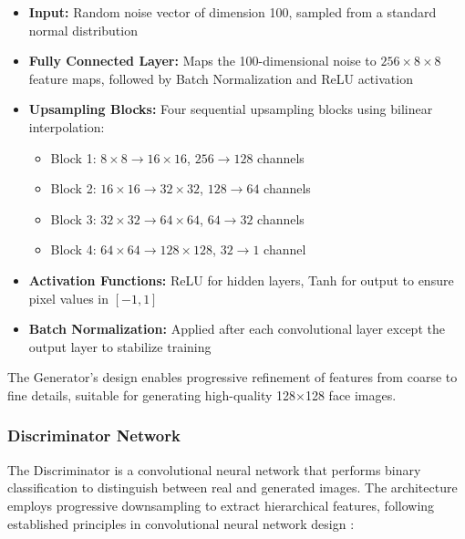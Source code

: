 \documentclass[a4paper, journal]{IEEEtran}
\begin{document}
\begin{itemize}
    \item \textbf{Input:} Random noise vector of dimension 100, sampled from a standard normal distribution
    \item \textbf{Fully Connected Layer:} Maps the 100-dimensional noise to $256 \times 8 \times 8$ feature maps, followed by Batch Normalization and ReLU activation
    \item \textbf{Upsampling Blocks:} Four sequential upsampling blocks using bilinear interpolation:
          \begin{itemize}
              \item Block 1: $8 \times 8 \rightarrow 16 \times 16$, $256 \rightarrow 128$ channels
              \item Block 2: $16 \times 16 \rightarrow 32 \times 32$, $128 \rightarrow 64$ channels
              \item Block 3: $32 \times 32 \rightarrow 64 \times 64$, $64 \rightarrow 32$ channels
              \item Block 4: $64 \times 64 \rightarrow 128 \times 128$, $32 \rightarrow 1$ channel
          \end{itemize}
    \item \textbf{Activation Functions:} ReLU for hidden layers, Tanh for output to ensure pixel values in $[-1, 1]$
    \item \textbf{Batch Normalization:} Applied after each convolutional layer except the output layer to stabilize training
\end{itemize}

The Generator's design enables progressive refinement of features from coarse to fine details, suitable for generating high-quality 128×128 face images.

\subsubsection{Discriminator Network}
The Discriminator is a convolutional neural network that performs binary classification to distinguish between real and generated images. The architecture employs progressive downsampling to extract hierarchical features, following established principles in convolutional neural network design \cite{krizhevsky2012imagenet}:
\end{document}

